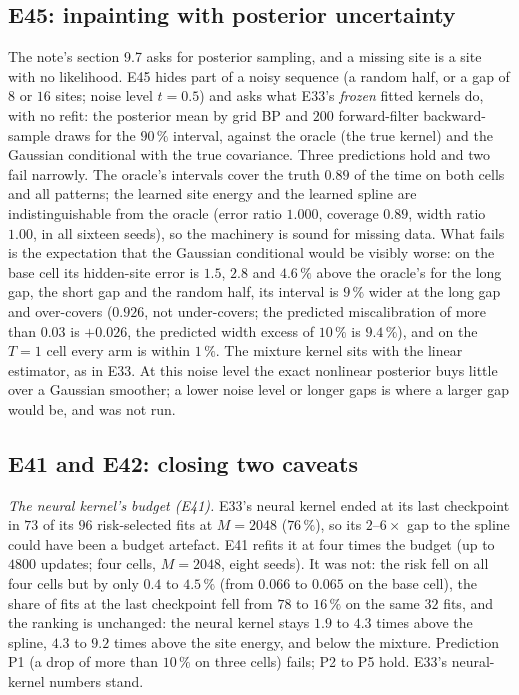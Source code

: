 \documentclass[10pt,a4paper]{article}
\theoremstyle{plain}
\theoremstyle{remark}
\begin{document}
\subsection{E45: inpainting with posterior uncertainty}

The note's section 9.7 asks for posterior sampling, and a missing site is a site with no likelihood. E45 hides part of a noisy sequence (a random half, or a gap of $8$ or $16$ sites; noise level $t=0.5$) and asks what E33's \emph{frozen} fitted kernels do, with no refit: the posterior mean by grid BP and $200$ forward-filter backward-sample draws for the $90\,\%$ interval, against the oracle (the true kernel) and the Gaussian conditional with the true covariance. Three predictions hold and two fail narrowly. The oracle's intervals cover the truth $0.89$ of the time on both cells and all patterns; the learned site energy and the learned spline are indistinguishable from the oracle (error ratio $1.000$, coverage $0.89$, width ratio $1.00$, in all sixteen seeds), so the machinery is sound for missing data. What fails is the expectation that the Gaussian conditional would be visibly worse: on the base cell its hidden-site error is $1.5$, $2.8$ and $4.6\,\%$ above the oracle's for the long gap, the short gap and the random half, its interval is $9\,\%$ wider at the long gap and over-covers ($0.926$, not under-covers; the predicted miscalibration of more than $0.03$ is $+0.026$, the predicted width excess of $10\,\%$ is $9.4\,\%$), and on the $T=1$ cell every arm is within $1\,\%$. The mixture kernel sits with the linear estimator, as in E33. At this noise level the exact nonlinear posterior buys little over a Gaussian smoother; a lower noise level or longer gaps is where a larger gap would be, and was not run.

\subsection{E41 and E42: closing two caveats}

\emph{The neural kernel's budget (E41).} E33's neural kernel ended at its last checkpoint in $73$ of its $96$ risk-selected fits at $M=2048$ ($76\,\%$), so its $2$--$6\times$ gap to the spline could have been a budget artefact. E41 refits it at four times the budget
(up to $4800$ updates; four cells, $M=2048$, eight seeds). It was not: the risk fell on all four cells but by only $0.4$ to $4.5\,\%$ (from $0.066$ to $0.065$ on the base cell), the share of fits at the last checkpoint fell from $78$ to $16\,\%$ on the same $32$ fits,
and the ranking is unchanged: the neural kernel stays $1.9$ to $4.3$ times above the spline, $4.3$ to $9.2$ times above the site energy, and below the mixture. Prediction P1 (a drop of more than $10\,\%$ on three cells) fails; P2 to P5 hold.
E33's neural-kernel numbers stand.
\end{document}
